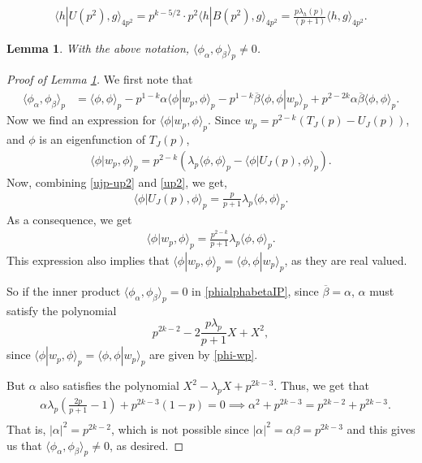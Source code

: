 \documentclass[10pt,a4paper]{amsart}
\newtheorem{lem}{Lemma}
\newcommand{\lan}{\langle }
\newcommand{\ran}{\rangle}
\begin{document}
\begin{equation} \label{up2}
    \begin{split}
        \lan h|U(p^2) , g\ran_{4p^2}=  p^{k-5/2}\cdot p^2 \lan h|B(p^2), g\ran_{4p^2}= \frac{p\lambda_h(p)}{(p+1)}\lan h, g\ran_{4p^2}.
    \end{split}
\end{equation}

\begin{lem}\label{lem:phialphabeta}
   With the above notation, $\lan \phi_\alpha, \phi_\beta\ran_p \neq 0$.
\end{lem}

\begin{proof}[Proof of Lemma \ref{lem:phialphabeta}]
We first note that
\begin{align}\label{phialphabetaIP}
    \lan \phi_\alpha, \phi_\beta\ran_p&=\lan \phi,\phi\ran_p - p^{1-k}\alpha\lan \phi|w_p, \phi\ran_p-p^{1-k}\overline{\beta}\lan \phi, \phi|w_p\ran_p+ p^{2-2k}\alpha\overline{\beta}\lan \phi, \phi\ran_p.
\end{align}
Now we find an expression for $\lan \phi|w_p, \phi\ran_p$. Since $w_p= p^{2-k}(T_J(p)-U_J(p))$, and $\phi$ is an eigenfunction of $T_J(p)$,  
\begin{align}
\lan \phi|w_p, \phi\ran_p= p^{2-k}(\lambda_p\lan \phi, \phi\ran_p -\lan \phi|U_J(p), \phi\ran_p).
\end{align}
%
Now, combining \eqref{ujp-up2} and \eqref{up2}, we get,
\begin{align}
    \lan \phi|U_J(p), \phi\ran_p= \frac{p}{p+1}\lambda_p \lan\phi, \phi\ran_p.
\end{align}
As a consequence, we get
\begin{align} \label{phi-wp}
    \lan \phi|w_p, \phi\ran_p= \frac{p^{2-k}}{p+1}\lambda_p \lan \phi, \phi\ran_p.
\end{align}
This expression also implies that $\lan \phi|w_p, \phi\ran_p= \lan \phi, \phi|w_p\ran_p$, as they are real valued.


So if the inner product $ \lan \phi_\alpha, \phi_\beta\ran_p=0$ in \eqref{phialphabetaIP}, since $\overline{\beta}=\alpha$, $\alpha$ must satisfy the polynomial
\begin{equation}
    p^{2k-2}- 2\frac{p\lambda_p}{p+1} X+ X^2,
\end{equation}
since $\lan \phi|w_p, \phi\ran_p= \lan \phi, \phi|w_p\ran_p$ are given by \eqref{phi-wp}.

But $\alpha$ also satisfies the polynomial $X^2-\lambda_p X+ p^{2k-3}$. Thus, we get that
\begin{align}
    &\alpha\lambda_p\left(\frac{2p}{p+1}-1\right)+p^{2k-3}(1-p)=0\implies \alpha^2+p^{2k-3}= p^{2k-2}+p^{2k-3}.\\
\end{align}
That is, $|\alpha|^2= p^{2k-2}$, which is not possible since $|\alpha|^2=\alpha\beta=p^{2k-3}$ and this gives us that $\lan \phi_\alpha, \phi_\beta\ran_p\neq 0$, as desired.
\end{proof}
\end{document}
